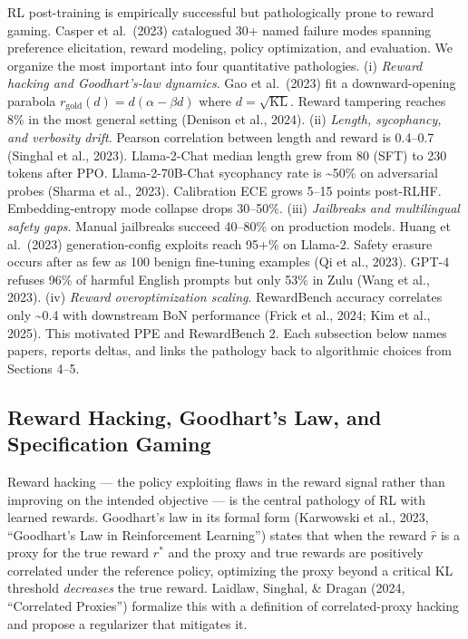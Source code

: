 RL post-training is empirically successful but pathologically prone to reward gaming. Casper et al.~(2023) catalogued 30+ named failure modes spanning preference elicitation, reward modeling, policy optimization, and evaluation. We organize the most important into four quantitative pathologies. (i) \emph{Reward hacking and Goodhart's-law dynamics}. Gao et al.~(2023) fit a downward-opening parabola \(r_{\mathrm{gold}}(d) = d(\alpha - \beta d)\) where \(d = \sqrt{\mathrm{KL}}\). Reward tampering reaches 8\% in the most general setting (Denison et al., 2024). (ii) \emph{Length, sycophancy, and verbosity drift}. Pearson correlation between length and reward is 0.4--0.7 (Singhal et al., 2023). Llama-2-Chat median length grew from 80 (SFT) to 230 tokens after PPO. Llama-2-70B-Chat sycophancy rate is \textasciitilde50\% on adversarial probes (Sharma et al., 2023). Calibration ECE grows 5--15 points post-RLHF. Embedding-entropy mode collapse drops 30--50\%. (iii) \emph{Jailbreaks and multilingual safety gaps}. Manual jailbreaks succeed 40--80\% on production models. Huang et al.~(2023) generation-config exploits reach 95+\% on Llama-2. Safety erasure occurs after as few as 100 benign fine-tuning examples (Qi et al., 2023). GPT-4 refuses 96\% of harmful English prompts but only 53\% in Zulu (Wang et al., 2023). (iv) \emph{Reward overoptimization scaling}. RewardBench accuracy correlates only \textasciitilde0.4 with downstream BoN performance (Frick et al., 2024; Kim et al., 2025). This motivated PPE and RewardBench 2. Each subsection below names papers, reports deltas, and links the pathology back to algorithmic choices from Sections 4--5.

\subsection{Reward Hacking, Goodhart's Law, and Specification Gaming}\label{reward-hacking-goodharts-law-and-specification-gaming}

Reward hacking --- the policy exploiting flaws in the reward signal rather than improving on the intended objective --- is the central pathology of RL with learned rewards. Goodhart's law in its formal form (Karwowski et al., 2023, ``Goodhart's Law in Reinforcement Learning'') states that when the reward \(\hat r\) is a proxy for the true reward \(r^*\) and the proxy and true rewards are positively correlated under the reference policy, optimizing the proxy beyond a critical KL threshold \emph{decreases} the true reward. Laidlaw, Singhal, \& Dragan (2024, ``Correlated Proxies'') formalize this with a definition of correlated-proxy hacking and propose a regularizer that mitigates it.

